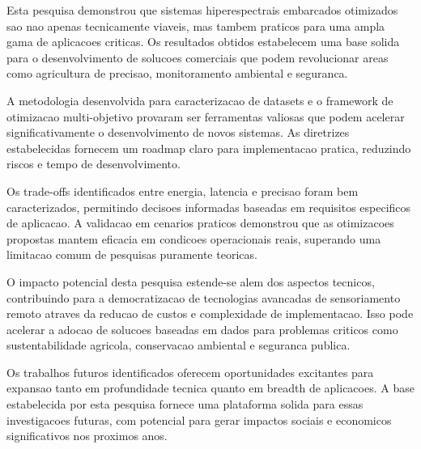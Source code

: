 Esta pesquisa demonstrou que sistemas hiperespectrais embarcados otimizados sao nao apenas tecnicamente viaveis, mas tambem praticos para uma ampla gama de aplicacoes criticas. Os resultados obtidos estabelecem uma base solida para o desenvolvimento de solucoes comerciais que podem revolucionar areas como agricultura de precisao, monitoramento ambiental e seguranca.

A metodologia desenvolvida para caracterizacao de datasets e o framework de otimizacao multi-objetivo provaram ser ferramentas valiosas que podem acelerar significativamente o desenvolvimento de novos sistemas. As diretrizes estabelecidas fornecem um roadmap claro para implementacao pratica, reduzindo riscos e tempo de desenvolvimento.

Os trade-offs identificados entre energia, latencia e precisao foram bem caracterizados, permitindo decisoes informadas baseadas em requisitos especificos de aplicacao. A validacao em cenarios praticos demonstrou que as otimizacoes propostas mantem eficacia em condicoes operacionais reais, superando uma limitacao comum de pesquisas puramente teoricas.

O impacto potencial desta pesquisa estende-se alem dos aspectos tecnicos, contribuindo para a democratizacao de tecnologias avancadas de sensoriamento remoto atraves da reducao de custos e complexidade de implementacao. Isso pode acelerar a adocao de solucoes baseadas em dados para problemas criticos como sustentabilidade agricola, conservacao ambiental e seguranca publica.

Os trabalhos futuros identificados oferecem oportunidades excitantes para expansao tanto em profundidade tecnica quanto em breadth de aplicacoes. A base estabelecida por esta pesquisa fornece uma plataforma solida para essas investigacoes futuras, com potencial para gerar impactos sociais e economicos significativos nos proximos anos.